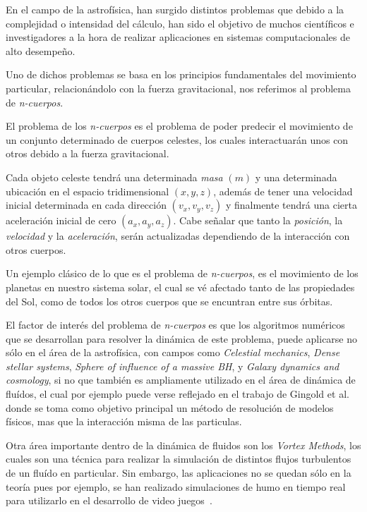 En el campo de la astrofísica,
han surgido distintos problemas que debido a la complejidad
o intensidad del cálculo, han sido el objetivo de muchos
científicos e investigadores a la hora de realizar
aplicaciones en sistemas computacionales de alto desempeño.

Uno de dichos problemas se basa en los principios
fundamentales del movimiento particular, relacionándolo con
la fuerza gravitacional, nos referimos al problema de \emph{n-cuerpos}.

El problema de los \emph{n-cuerpos} es el problema de poder
predecir el movimiento de un conjunto determinado de cuerpos celestes,
los cuales interactuarán unos con otros debido a la fuerza
gravitacional.

Cada objeto celeste tendrá una determinada \emph{masa} $(m)$
y una determinada ubicación en el espacio
tridimensional $(x,y,z)$, además de tener una velocidad inicial
determinada en cada dirección $(v_{x},v_{y},v_{z})$ y finalmente
tendrá una cierta aceleración inicial de cero $(a_{x},a_{y},a_{z})$.
Cabe señalar que tanto la \emph{posición}, la \emph{velocidad} y la \emph{aceleración},
serán actualizadas dependiendo de la interacción con otros cuerpos.

Un ejemplo clásico de lo que es el problema de \emph{n-cuerpos},
es el movimiento de los planetas en nuestro sistema solar,
el cual se vé afectado tanto de las propiedades del Sol,
como de todos los otros cuerpos que se encuntran entre sus órbitas.

El factor de interés del problema de \emph{n-cuerpos}
es que los algoritmos numéricos que se desarrollan para resolver
la dinámica de este problema, puede aplicarse no sólo en el área de la astrofísica,
con campos como \emph{Celestial mechanics}, \emph{Dense stellar systems},
\emph{Sphere of influence of a massive BH}, y \emph{Galaxy dynamics and cosmology},
si no que también es ampliamente utilizado en el área de dinámica de fluídos,
el cual por  ejemplo puede verse reflejado en el trabajo de Gingold et al.~\cite{gingold}
donde se toma como objetivo principal un método de resolución de modelos físicos,
mas que la interacción misma de las particulas.

Otra área importante dentro de la dinámica de fluidos son los \emph{Vortex Methods},
los cuales son una técnica para realizar la simulación de distintos flujos turbulentos
de un fluído en particular. Sin embargo, las aplicaciones no se quedan sólo en la teoría
pues por ejemplo, se han realizado simulaciones de humo en tiempo real
para utilizarlo en el desarrollo de video juegos~\cite{gourlay}.

